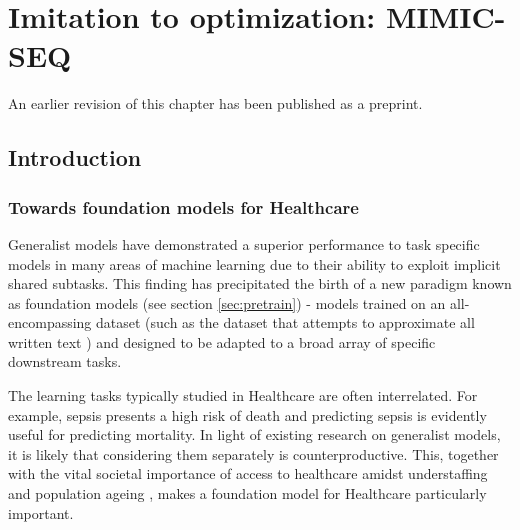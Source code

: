 \chapter{Imitation to optimization: MIMIC-SEQ} \label{ch:mimicseq}

\begin{remark}
    An earlier revision of this chapter \cite{liventsevIntensiveCareOne2024} has been published as a preprint.
\end{remark}

\section{Introduction}

\subsection{Towards foundation models for Healthcare}

Generalist models have demonstrated a superior performance to task specific models in many areas of machine learning \cite{reedGeneralistAgent2022} due to their ability to exploit implicit shared subtasks. 
This finding has precipitated the birth of a new paradigm known as foundation models (see section \ref{sec:pretrain}) - models trained on an all-encompassing dataset (such as the dataset that attempts to approximate all written text \cite{chelbaOneBillionWord2013}) and designed to be adapted to a broad array of specific downstream tasks.

The learning tasks typically studied in Healthcare are often interrelated. 
For example, sepsis presents a high risk of death \cite{schlichtingRecognizingManagingSevere2007} and predicting sepsis is evidently useful for predicting mortality.
In light of existing research on generalist models, it is likely that considering them separately is counterproductive.
This, together with the vital societal importance of access to healthcare amidst understaffing \cite{ashleyy.metcalfHospitalUnitUnderstaffing2016,hudsonUnderstaffing2015,mercerMessageEditorinChief2008,munnUnderstaffingWardsCompromising2017,r.stanleyUnderstaffedOverwhelmed2010,SurveyShowsHidden1993,thelancetHealthcareSystemStaffing2018,UnderstaffingSignificantIssue2012} and population ageing \cite{HealthcareChallengesPosed2012,aslamAgeingPopulationHealthcare2021,l.weckerAgingPopulationCritical1991,lloyd-sherlockPopulationAgeingHealth2012,mahishaleAgeingWorldHealth2015,mannAgingPopulationIts2004,sammyGlobalChallengeAgeing2019,suzmanHealthAgeingWorld2015}, makes a foundation model for Healthcare particularly important.

